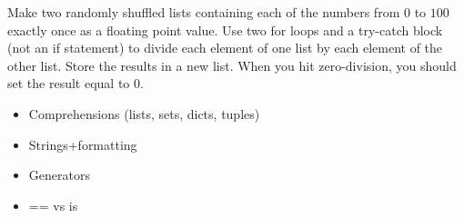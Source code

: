 
\begin{problem}

Make two randomly shuffled lists containing each of the numbers from $0$ to $100$ exactly once as a floating point value.
Use two for loops and a try-catch block (not an if statement) to divide each element of one list by each element of the other list.
Store the results in a new list.
When you hit zero-division, you should set the result equal to $0$.

\end{problem}



\begin{itemize}
\item Comprehensions (lists, sets, dicts, tuples)
\item Strings+formatting
\item Generators
\item == vs is
\end{itemize}